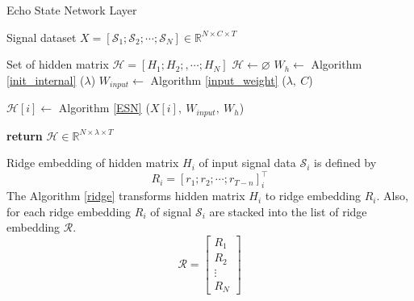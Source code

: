 \begin{algorithm}
    \caption{Echo State Network Layer}
    \label{ESN_layer}
    \begin{algorithmic}[1]
        \renewcommand{\algorithmicrequire}{\textbf{Input:}}
        \renewcommand{\algorithmicensure}{\textbf{Output:}}
        \Require Signal dataset $X = [\mathcal{S}_1;\mathcal{S}_2;\cdots; \mathcal{S}_N]\in\mathbb{R}^{N\times C\times T}$        

        \Ensure Set of hidden matrix $\mathcal{H} = [H_1; H_2;,\cdots;H_{N}]$
        \State $\mathcal{H}\gets\varnothing$
        \State $W_h\gets$ Algorithm \ref{init_internal} ($\lambda$)
        \State $W_{input}\gets $ Algorithm \ref{input_weight} ($\lambda,\ C$)
        
            \State $\mathcal{H}[i] \gets$ Algorithm \ref{ESN} ($X[i],\ W_{input},\ W_h$)
        \EndFor

    \State \textbf{return} $\mathcal{H}\in\mathbb{R}^{N\times \lambda\times T}$
    \end{algorithmic}
\end{algorithm}

Ridge embedding of hidden matrix $H_i$ of input signal data $\mathcal{S}_i$ is defined by $$R_{i} = [r_1; r_2;\cdots; r_{T-n}]^\top_i$$
The Algorithm \ref{ridge} transforms hidden matrix $H_i$ to ridge embedding $R_i$. Also, for each ridge embedding $R_i$ of signal $\mathcal{S}_i$ are stacked into the list of ridge embedding $\mathcal{R}$.
$$\mathcal{R} = 
\begin{bmatrix}
    R_{1}\\ R_{2}\\ \vdots\\ R_{N}
\end{bmatrix}
$$





